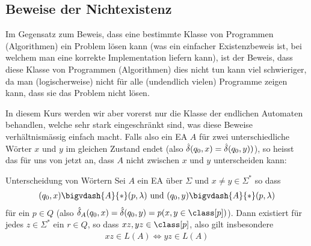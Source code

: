 \subsection{Beweise der Nichtexistenz}
Im Gegensatz zum Beweis, dass eine bestimmte Klasse von Programmen (Algorithmen) ein Problem lösen kann
(was ein einfacher Existenzbeweis ist, bei welchem man eine korrekte Implementation liefern kann),
ist der Beweis, dass diese Klasse von Programmen (Algorithmen) dies nicht tun kann viel schwieriger,
da man (logischerweise) nicht für alle (undendlich vielen) Programme zeigen kann, dass sie das Problem nicht lösen.

In diesem Kurs werden wir aber vorerst nur die Klasse der endlichen Automaten behandlen, welche sehr stark eingeschränkt sind,
was diese Beweise verhältnismässig einfach macht.
Falls also ein EA $A$ für zwei unterschiedliche Wörter $x$ und $y$ im gleichen Zustand endet (also $\hat{\delta}(q_0, x) = \hat{\delta}(q_0, y))$),
so heisst das für uns von jetzt an, dass $A$ nicht zwischen $x$ und $y$ unterscheiden kann:

\begin{lemma}[]{Unterscheidung von Wörtern}
    Sei $A$ ein EA über $\Sigma$ und $x \neq y \in \Sigma^*$ so dass
    \begin{align*}
        (q_0, x) \bigvdash{A}{*} (p, \lambda) \text{ und } (q_0, y) \bigvdash{A}{*} (p, \lambda)
    \end{align*}
    für ein $p \in Q$ (also $\hdelta_A (q_0, x) = \hdelta(q_0, y) = p(x, y \in \class [p])$).
    Dann existiert für jedes $z \in \Sigma^*$ ein $r \in Q$, so dass $xz, yz \in \class[p]$, also gilt insbesondere
    \begin{align*}
        xz \in L(A) \Longleftrightarrow yz \in L(A)
    \end{align*}
\end{lemma}

